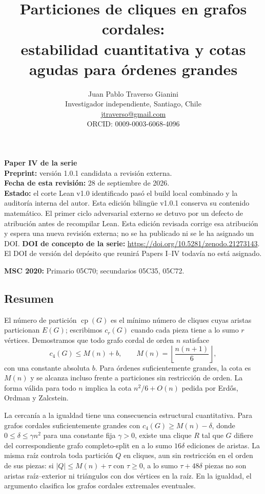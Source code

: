 \documentclass[spanish,11pt,a4paper]{article}
\title{Particiones de cliques en grafos cordales:\\estabilidad cuantitativa y cotas agudas para órdenes grandes}
\author{Juan Pablo Traverso Gianini\\
\small Investigador independiente, Santiago, Chile\\
\small \href{mailto:jtraverso@gmail.com}{jtraverso@gmail.com}\\
\small ORCID: 0009-0003-6068-4096}
\date{}
\begin{document}
\raggedbottom
\maketitle
\textbf{Paper IV de la serie}\\
\textbf{Preprint:} versión 1.0.1 candidata a revisión externa.\\
\textbf{Fecha de esta revisión:} 28 de septiembre de 2026.\\
\textbf{Estado:} el corte Lean v1.0 identificado pasó el build local combinado y la auditoría interna del autor. Esta edición bilingüe v1.0.1 conserva su contenido matemático. El primer ciclo adversarial externo se detuvo por un defecto de atribución antes de recompilar Lean. Esta edición revisada corrige esa atribución y espera una nueva revisión externa; no se ha publicado ni se le ha asignado un DOI. \textbf{DOI de concepto de la serie:} \url{https://doi.org/10.5281/zenodo.21273143}. El DOI de versión del depósito que reunirá Papers I--IV todavía no está asignado.

\textbf{MSC 2020:} Primario 05C70; secundarios 05C35, 05C72.

\subsection{Resumen}\label{resumen}

El número de partición \(\operatorname{cp}(G)\) es el mínimo número de cliques cuyas aristas particionan \(E(G)\); escribimos \(c_r(G)\) cuando cada pieza tiene a lo sumo \(r\) vértices. Demostramos que todo grafo cordal de orden \(n\) satisface \[
c_4(G)\le M(n)+b,\qquad M(n)=\left\lfloor\frac{n(n+1)}6\right\rfloor,
\] con una constante absoluta \(b\). Para órdenes suficientemente grandes, la cota es \(M(n)\) y se alcanza incluso frente a particiones sin restricción de orden. La forma válida para todo \(n\) implica la cota \(n^2/6+O(n)\) pedida por Erdős, Ordman y Zalcstein.

La cercanía a la igualdad tiene una consecuencia estructural cuantitativa. Para grafos cordales suficientemente grandes con \(c_4(G)\ge M(n)-\delta\), donde \(0\le\delta\le\gamma n^2\) para una constante fija \(\gamma>0\), existe una clique \(R\) tal que \(G\) difiere del correspondiente grafo completo-split en a lo sumo \(16\delta\) ediciones de aristas. La misma raíz controla toda partición \(Q\) en cliques, aun sin restricción en el orden de sus piezas: si \(|Q|\le M(n)+\tau\) con \(\tau\ge0\), a lo sumo \(\tau+48\delta\) piezas no son aristas raíz--exterior ni triángulos con dos vértices en la raíz. En la igualdad, el argumento clasifica los grafos cordales extremales eventuales.
\end{document}
